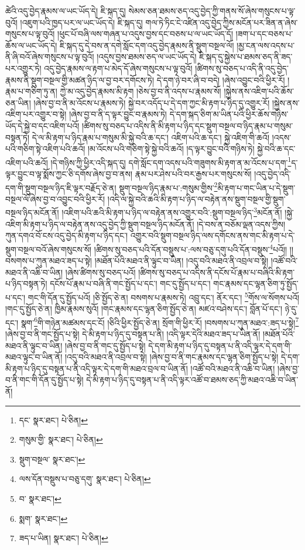 ཚེའི་འདུ་བྱེད་རྣམས་ལ་ཡང་ཡོད་དེ། ཇི་སྐད་དུ། སེམས་ཅན་ཐམས་ཅད་འདུ་བྱེད་ཀྱི་གནས་སོ་ཞེས་གསུངས་པ་ལྟ་བུའོ། །འཇུག་པའི་ཁྱད་པར་ལ་ཡང་ཡོད་དེ། ཇི་སྐད་དུ། གལ་ཏེ་ཏིང་ངེ་འཛིན་འདུ་བྱེད་ཀྱིས་མངོན་པར་ཟིན་ན་ཞེས་གསུངས་པ་ལྟ་བུའོ། །ཕུང་པོ་བཞི་ལས་གཞན་པ་འདུས་བྱས་དང་བཅས་པ་ལ་ཡང་ཡོད་དོ། །ཟག་པ་དང་བཅས་པ་ཆོས་ལ་ཡང་ཡོད་དེ། ཇི་སྐད་དུ་དེ་བས་ན་དགེ་སློང་དག་འདུ་བྱེད་རྣམས་ནི་སྡུག་བསྔལ་ལོ། །མྱ་ངན་ལས་འདས་པ་ནི་ཞི་བའོ་ཞེས་གསུངས་པ་ལྟ་བུའོ། །འདུས་བྱས་ཐམས་ཅད་ལ་ཡང་ཡོད་དེ། ཇི་སྐད་དུ་སྐྱེས་པ་ཐམས་ཅད་ནི་ཟད་པར་འགྱུར་ཏེ། འདུ་བྱེད་རྣམས་ལ་རྟག་པ་མེད་དོ་ཞེས་གསུངས་པ་ལྟ་བུའོ། །ཚིགས་སུ་བཅད་པ་འདི་ནི་འདུ་བྱེད་རྣམས་ནི་སྡུག་བསྔལ་གྱི་མཚན་ཉིད་ལ་བྱ་བར་དགོངས་ཏེ། དེ་དག་ཉེ་བར་ཞི་བ་བདེ། །ཞེས་འབྱུང་བའི་ཕྱིར་རོ། །རྣམ་པ་གཅིག་ཏུ་ན། ཀྱེ་མ་འདུ་བྱེད་རྣམས་མི་རྟག །ཅེས་བྱ་བ་ནི་འདས་པ་རྣམས་སོ། །སྐྱེས་ནས་འཇིག་པའི་ཆོས་ཅན་ཡིན། །ཞེས་བྱ་བ་ནི་མ་འོངས་པ་རྣམས་ཏེ། སྐྱེ་བར་འདོད་པ་དེ་དག་ཀྱང་མི་རྟག་པ་ཉིད་དུ་འགྱུར་རོ། །སྐྱེས་ནས་འཇིག་པར་འགྱུར་བ་སྟེ། །ཞེས་བྱ་བ་ནི་ད་ལྟར་བྱུང་བ་རྣམས་ཏེ། དེ་དག་སྐད་ཅིག་མ་ཡིན་པའི་ཕྱིར་ཆོས་གཉིས་ཡོད་དེ་སྐྱེ་བ་དང་འཇིག་པའོ། །ཚིགས་སུ་བཅད་པ་འདིས་ནི་མི་རྟག་པ་ཉིད་དང་སྡུག་བསྔལ་བ་ཉིད་རྣམ་པ་གསུམ་བསྟན་ཏེ། དེ་ལ་མི་རྟག་པ་ཉིད་རྣམ་པ་གསུམ་མི་སྐྱེ་བའི་ཆ་དང་། འཇིག་པའི་ཆ་དང་། སྐྱེ་འཇིག་གི་ཆའོ། །འདས་པའི་གཅིག་སྟེ་འཇིག་པའི་ཆའོ། །མ་འོངས་པའི་གཅིག་སྟེ་སྐྱེ་བའི་ཆའོ། །ད་ལྟར་བྱུང་བའི་གཉིས་ཏེ། སྐྱེ་བའི་ཆ་དང་འཇིག་པའི་ཆའོ། །དེ་གཉིས་ཀྱི་ཕྱིར་འདི་སྐད་དུ། དགེ་སློང་དག་འདས་པའི་གཟུགས་མི་རྟག་ན་མ་འོངས་པ་དག་\footnote{དང་  སྣར་ཐང་།  པེ་ཅིན། }ད་ལྟར་བྱུང་བ་ལྟ་སྨོས་ཀྱང་ཅི་དགོས་ཞེས་བྱ་བ་ནས། རྣམ་པར་ཤེས་པའི་བར་རྒྱས་པར་གསུངས་སོ། །འདུ་བྱེད་འདི་དག་གི་སྡུག་བསྔལ་ཉིད་ཇི་ལྟར་བརྗོད་ཅེ་ན། སྡུག་བསྔལ་ཉིད་རྣམ་པ་:གསུམ་གྱིས་\footnote{གསུམ་གྱི་  སྣར་ཐང་།  པེ་ཅིན། }མི་རྟག་པ་གང་ཡིན་པ་དེ་སྡུག་བསྔལ་ལོ་ཞེས་བྱ་བ་འབྱུང་བའི་ཕྱིར་རོ། །འདི་ལ་སྐྱེ་བའི་ཆའི་མི་རྟག་པ་ཉིད་ལ་བརྟེན་ནས་སྡུག་བསྔལ་གྱི་སྡུག་བསྔལ་ཉིད་མངོན་ནོ། །འཇིག་པའི་ཆའི་མི་རྟག་པ་ཉིད་ལ་བརྟེན་ནས་འགྱུར་བའི་:སྡུག་བསྔལ་ཉིད་\footnote{སྡུག་བསྔལ་  སྣར་ཐང་། }མངོན་ནོ། །སྐྱེ་འཇིག་མི་རྟག་པ་ཉིད་ལ་བརྟེན་ནས་འདུ་བྱེད་ཀྱི་སྡུག་བསྔལ་ཉིད་མངོན་ནོ། །དེ་བས་ན་བཅོམ་ལྡན་འདས་ཀྱིས། ཀུན་དགའ་བོ་ངས་འདུ་བྱེད་མི་རྟག་པ་ཉིད་དང་། འགྱུར་བའི་སྡུག་བསྔལ་ཉིད་ལས་དགོངས་ནས་གང་མི་རྟག་པ་དེ་སྡུག་བསྔལ་བའོ་ཞེས་གསུངས་སོ། །ཚིགས་སུ་བཅད་པའི་དོན་བསྡུས་པ་:ལས་བཅུ་དགུ་པའི་དོན་བསྡུས་\footnote{ལས་དོན་བསྡུས་པ་བཅུ་དགུ་  སྣར་ཐང་།  པེ་ཅིན། }པའོ།། །།བསགས་པ་ཀུན་མཐའ་ཟད་པ་སྟེ། །མཐོན་པོའི་མཐའ་ནི་ལྟུང་བ་ཡིན། །འདུ་བའི་མཐའ་ནི་འབྲལ་བ་སྟེ། །འཚོ་བའི་མཐའ་ནི་འཆི་བ་ཡིན། །ཞེས་ཚིགས་སུ་བཅད་པའོ། །ཚིགས་སུ་བཅད་པ་འདིས་ནི་དངོས་པོ་རྣམ་པ་བཞིའི་མི་རྟག་པ་ཉིད་བསྟན་ཏེ། དངོས་པོ་རྣམ་པ་བཞི་ནི་གང་སྤྱོད་པ་དང་། གང་དུ་སྤྱོད་པ་དང་། གང་རྣམས་དང་ལྷན་ཅིག་ཏུ་སྤྱོད་པ་དང་། གང་གི་དོན་དུ་སྤྱོད་པའོ། །ཅི་སྤྱོད་ཅེ་ན། བསགས་པ་རྣམས་ཏེ། འབྲུ་དང་། ནོར་དང་། \footnote{བ་  སྣར་ཐང་། }གོས་ལ་སོགས་པའོ། །གང་དུ་སྤྱོད་ཅེ་ན། ཁྱིམ་རྣམས་སུའོ། །གང་རྣམས་དང་ལྷན་ཅིག་སྤྱོད་ཅེ་ན། མཛའ་བཤེས་དང་། བློན་པོ་དང་། ཉེ་དུ་དང་། སྣག་\footnote{སྨག་  སྣར་ཐང་། }གི་གཉེན་མཚམས་དང་ངོ། །ཅིའི་ཕྱིར་སྤྱོད་ཅེ་ན། སྲོག་གི་ཕྱིར་རོ། །བསགས་པ་ཀུན་མཐའ་:ཟད་པ་སྟེ།\footnote{ཟད་པ་ཡིན།  སྣར་ཐང་།  པེ་ཅིན། } །ཞེས་བྱ་བ་ནི་གང་སྤྱོད་པ་སྟེ། དེ་མི་རྟག་པ་ཉིད་དུ་བསྟན་པ་ནི། །འདི་ལྟར་དེའི་མཐའ་ཟད་པ་ཡིན་ནོ། །མཐོན་པོའི་མཐའ་ནི་ལྟུང་བ་ཡིན། །ཞེས་བྱ་བ་ནི་གང་དུ་སྤྱོད་པ་སྟེ། དེ་དག་མི་རྟག་པ་ཉིད་དུ་བསྟན་པ་ནི་འདི་ལྟར་དེ་དག་གི་མཐའ་ལྟུང་བ་ཡིན་ནོ། །འདུ་བའི་མཐའ་ནི་འབྲལ་བ་སྟེ། །ཞེས་བྱ་བ་ནི་གང་རྣམས་དང་ལྷན་ཅིག་སྤྱོད་པ་སྟེ། དེ་དག་མི་རྟག་པ་ཉིད་དུ་བསྟན་པ་ནི་འདི་ལྟར་དེ་དག་གི་མཐའ་བྲལ་བ་ཡིན་ནོ། །འཚོ་བའི་མཐའ་ནི་འཆི་བ་ཡིན། །ཞེས་བྱ་བ་ནི་གང་གི་དོན་དུ་སྤྱོད་པ་སྟེ། དེ་མི་རྟག་པ་ཉིད་དུ་བསྟན་པ་ནི་འདི་ལྟར་འཚོ་བ་ཐམས་ཅད་ཀྱི་མཐའ་འཆི་བ་ཡིན་ནོ། 